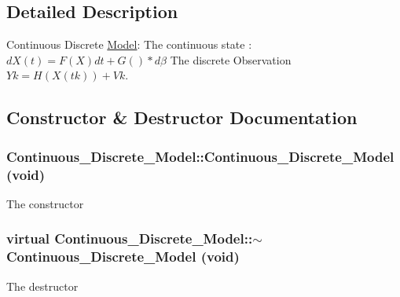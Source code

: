 \subsection{Detailed Description}
Continuous Discrete \hyperlink{class_model}{Model}: The continuous state : $ dX(t) = F(X)dt + G()*d\beta $ The discrete Observation $ Yk = H (X(tk)) + Vk $. 

\subsection{Constructor \& Destructor Documentation}
\hypertarget{class_continuous___discrete___model_fb738151cc4eb952d278d5531d10f97d}{
\subsubsection[{Continuous\_\-Discrete\_\-Model}]{\setlength{\rightskip}{0pt plus 5cm}Continuous\_\-Discrete\_\-Model::Continuous\_\-Discrete\_\-Model (void)}}
\label{class_continuous___discrete___model_fb738151cc4eb952d278d5531d10f97d}


The constructor \hypertarget{class_continuous___discrete___model_7c1ca102575a59207c3662181be1bdea}{
\subsubsection[{$\sim$Continuous\_\-Discrete\_\-Model}]{\setlength{\rightskip}{0pt plus 5cm}virtual Continuous\_\-Discrete\_\-Model::$\sim$Continuous\_\-Discrete\_\-Model (void)}}
\label{class_continuous___discrete___model_7c1ca102575a59207c3662181be1bdea}


The destructor 

